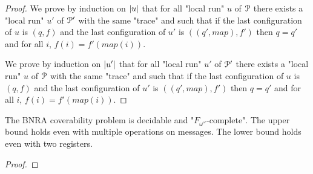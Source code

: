 \begin{proof}
	
	We prove by induction on $|u|$ that for all "local run" $u$ of $\mathcal{P}$ there exists a "local run" $u'$ of $\mathcal{P}'$ with the same "trace" and such that if the last configuration of $u$ is $(q,f)$ and the last configuration of $u'$ is $((q',map), f')$ then $q=q'$ and for all $i$, $f(i) = f'(map(i))$.  
	
	
	We prove by induction on $|u'|$ that for all "local run" $u'$ of $\mathcal{P}'$ there exists a "local run" $u$ of $\mathcal{P}$ with the same "trace" and such that if the last configuration of $u$ is $(q,f)$ and the last configuration of $u'$ is $((q',map), f')$ then $q=q'$ and for all $i$, $f(i) = f'(map(i))$.
	
\end{proof}

\begin{theorem}
	The BNRA coverability problem is decidable and "$F_{\omega^\omega}$-complete".
	The upper bound holds even with multiple operations on messages.
	The lower bound holds even with two registers.
\end{theorem}

\begin{proof}
\end{proof}
